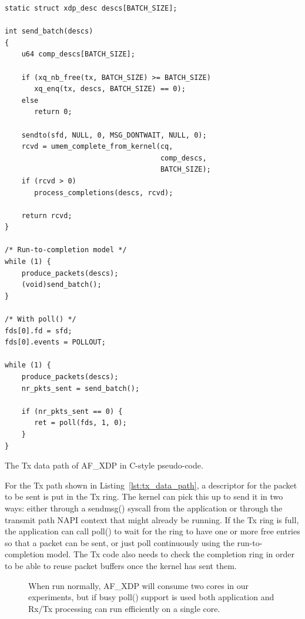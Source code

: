 \documentclass[9pt,numbers,reprint]{sigplanconf}
\begin{document}
\begin{listing}[p]
\begin{verbatim}
static struct xdp_desc descs[BATCH_SIZE];

int send_batch(descs)
{
    u64 comp_descs[BATCH_SIZE];

    if (xq_nb_free(tx, BATCH_SIZE) >= BATCH_SIZE)
       xq_enq(tx, descs, BATCH_SIZE) == 0);
    else
       return 0;

    sendto(sfd, NULL, 0, MSG_DONTWAIT, NULL, 0);
    rcvd = umem_complete_from_kernel(cq,
                                     comp_descs,
                                     BATCH_SIZE);
    if (rcvd > 0)
       process_completions(descs, rcvd);

    return rcvd;
}

/* Run-to-completion model */
while (1) {
    produce_packets(descs);
    (void)send_batch();
}

/* With poll() */
fds[0].fd = sfd;
fds[0].events = POLLOUT;

while (1) {
    produce_packets(descs);
    nr_pkts_sent = send_batch();

    if (nr_pkts_sent == 0) {
       ret = poll(fds, 1, 0);
    }
}
\end{verbatim}
\caption{The Tx data path of AF\_XDP in C-style pseudo-code.}
\label{lst:tx_data_path}
\end{listing}

For the Tx path shown in Listing~\ref{lst:tx_data_path}, a descriptor
for the packet to be sent is put in the Tx ring. The kernel can pick
this up to send it in two ways: either through a sendmsg() syscall
from the application or through the transmit path NAPI context that
might already be running. If the Tx ring is full, the application can
call poll() to wait for the ring to have one or more free entries so
that a packet can be sent, or just poll continuously using the
run-to-completion model. The Tx code also needs to check the completion
ring in order to be able to reuse packet buffers once the kernel has
sent them.

\begin{figure}[ht]
\resizebox{.5\textwidth}{!}{}
\caption{When run normally, AF\_XDP will consume two cores in our
  experiments, but if busy poll() support is used both application and
  Rx/Tx processing can run efficiently on a single core.}
\label{fig:two_vs_one_core}
\end{figure}
\end{document}
